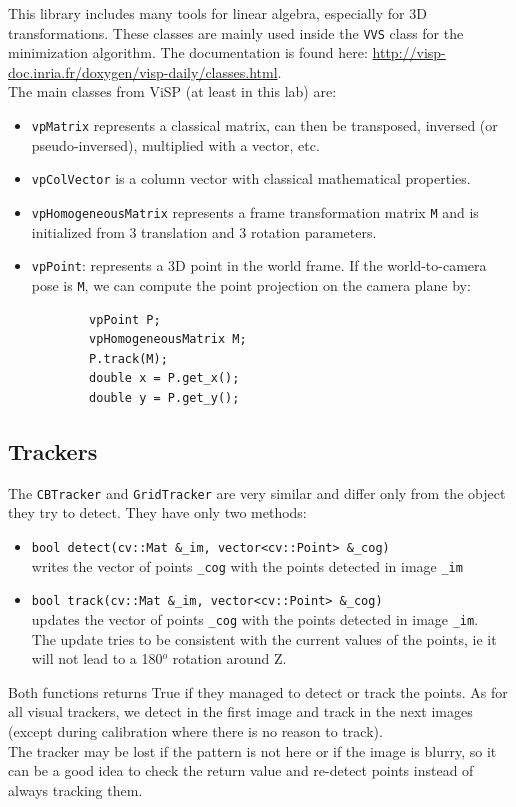 \documentclass{ecnreport}
\begin{document}
This library includes many tools for linear algebra, especially for 3D transformations. These classes are mainly used inside the \texttt{VVS} class for the minimization algorithm.
The documentation is found here: \url{http://visp-doc.inria.fr/doxygen/visp-daily/classes.html}.\\
The main classes from ViSP (at least in this lab) are:
\begin{itemize}
\item \texttt{vpMatrix} represents a classical matrix, can then be transposed, inversed (or pseudo-inversed), multiplied with a vector, etc.
\item \texttt{vpColVector} is a column vector with classical mathematical properties.
\item \texttt{vpHomogeneousMatrix} represents a frame transformation matrix \texttt{M} and is initialized from 3 translation and 3 rotation parameters.
\item \texttt{vpPoint}: represents a 3D point in the world frame. If the world-to-camera pose is \texttt{M}, we can compute the point projection on the camera plane by:
\begin{center}\cppstyle
\begin{lstlisting}
        vpPoint P;
        vpHomogeneousMatrix M;
        P.track(M);
        double x = P.get_x();
        double y = P.get_y();
\end{lstlisting}
\end{center}
\end{itemize}


\subsection{Trackers}

The \texttt{CBTracker} and \texttt{GridTracker} are very similar and differ only from the object they try to detect. They have only two methods:
\begin{itemize}
    \item \texttt{bool detect(cv::Mat \&\_im, vector<cv::Point> \&\_cog)} \\ writes the vector of points \texttt{\_cog} with the points detected in image \texttt{\_im}
    \item \texttt{bool track(cv::Mat \&\_im, vector<cv::Point> \&\_cog)} \\ updates the vector of points \texttt{\_cog} with the points detected in image \texttt{\_im}.\\The update tries to 
    be consistent with the current values of the points, ie it will not lead to a 180${}^o$ rotation around Z.
\end{itemize}Both functions returns True if they managed to detect or track the points.
As for all visual trackers, we detect in the first image and track in the next images (except during calibration where there is no reason to track).\\
The tracker may be lost if the pattern is not here or if the image is blurry, so it can be a good idea to check the return value and re-detect points instead of always tracking them.
\end{document}
